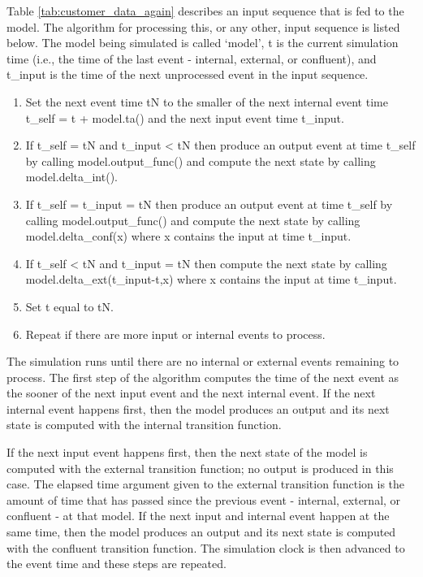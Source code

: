 Table \ref{tab:customer_data_again} describes an input sequence that is fed to the  model. The algorithm for processing this, or any other, input sequence is listed below. The  model being simulated is called `model', t is the current simulation time (i.e., the time of the last event - internal, external, or confluent), and t\_input is the time of the next unprocessed event in the input sequence. 
\begin{enumerate}
\item Set the next event time tN to the smaller of the next internal event time t\_self = t + model.ta() and the next input event time t\_input.
\item If t\_self = tN and t\_input < tN then produce an output event at time t\_self by calling model.output\_func() and compute the next state by calling model.delta\_int().
\item If t\_self = t\_input = tN then produce an output event at time t\_self by calling model.output\_func() and compute the next state by calling model.delta\_conf(x) where x contains the input at time t\_input.
\item If t\_self < tN and t\_input = tN then compute the next state by calling model.delta\_ext(t\_input-t,x) where x contains the input at time t\_input.
\item Set t equal to tN.
\item Repeat if there are more input or internal events to process.
\end{enumerate}

The simulation runs until there are no internal or external events remaining to process. The first step of the algorithm computes the time of the next event as the sooner of the next input event and the next internal event. If the next internal event happens first, then the model produces an output and its next state is computed with the internal transition function.

If the next input event happens first, then the next state of the model is computed with the external transition function; no output is produced in this case. The elapsed time argument given to the external transition function is the amount of time that has passed since the previous event - internal, external, or confluent - at that model. If the next input and internal event happen at the same time, then the model produces an output and its next state is computed with the confluent transition function. The simulation clock is then advanced to the event time and these steps are repeated.

